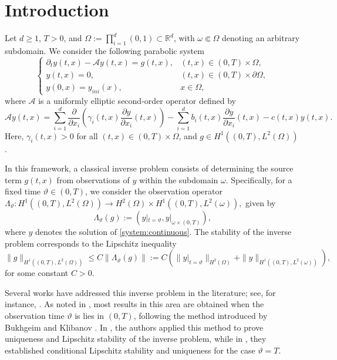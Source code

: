 \documentclass{amsart}
\numberwithin{equation}{section}
\begin{document}
\section{Introduction}
  Let $d\geq 1$, $T>0$, and $\displaystyle\Omega:= \prod_{i=1}^{d}(0,1)\subset \mathbb{R}^d$, with $\omega\Subset \Omega$ denoting an arbitrary subdomain. We consider the following parabolic system
\begin{equation}\label{system:continuous}
\begin{cases}
\partial_{t} y(t,x) - \mathcal{A}y(t,x)= g(t,x), & (t,x) \in (0,T)\times\Omega,\\
y(t,x) = 0, & (t,x) \in (0,T)\times\partial\Omega,\\
y(0,x) = y_{ini}(x), & x \in \Omega,
\end{cases}
\end{equation}
where $\mathcal{A}$ is a uniformly elliptic second-order  operator defined by
\begin{equation}\label{ope:A:continuous}
\mathcal{A}y(t,x)=\sum_{i=1}^{d}\frac{\partial}{\partial x_i}\left(\gamma_{i}(t,x)\frac{\partial y}{\partial x_{i}}(t,x)\right)-\sum_{i=1}^{d}b_{i}(t,x)\frac{\partial y}{\partial x_{i}}(t,x)-c(t,x)y(t,x).
\end{equation} 
Here, $\gamma_{i}(t,x)>0$ for all $(t,x)\in(0,T)\times\Omega$, and $g\in H^1((0,T),L^2(\Omega))$.

In this framework, a classical inverse problem consists of determining the source term $g(t,x)$ from observations of $y$ within the subdomain $\omega$. Specifically, for a fixed time $\vartheta\in(0,T)$, we consider the observation operator $\Lambda_{\vartheta}:H^1((0,T),L^2(\Omega))\to H^2(\Omega)\times H^1((0,T),L^2(\omega)),$ given by
$$\Lambda_{\vartheta}(g):= (y|_{t=\vartheta},y|_{\omega\times(0,T)}),$$
where $y$ denotes the solution of \eqref{system:continuous}. The stability of the inverse problem corresponds to the Lipschitz inequality
\begin{equation}\label{stability:continuous}
    \|g\|_{H^1((0,T),L^2(\Omega))}\leq C\|\Lambda_{\vartheta}(g)\|:= C\left(\|y|_{t=\vartheta}\|_{H^2(\Omega)}+\|y\|_{H^1((0,T),L^2(\omega))}\right),
\end{equation}
for some constant $C>0$.

Several works have addressed this inverse problem in the literature; see, for instance, \cite{IY-2024,IY-2024-II,IY-1998,Yamamoto_2001}. As noted in \cite{IY-2024}, most results in this area are obtained when the observation time $\vartheta$ is lies in $(0,T)$, following the method introduced by Bukhgeim and Klibanov \cite{bukhgeim1981global,MetodoB-K1981,Klibanov1984}. In \cite{IY-1998}, the authors applied this method to prove uniqueness and Lipschitz stability of the inverse problem, while in \cite{IY-2024-II}, they established conditional Lipschitz stability and uniqueness for the case $\vartheta=T$. 
\end{document}
